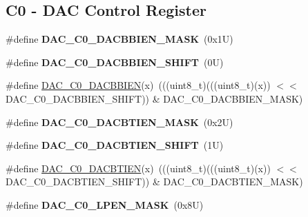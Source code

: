 \subsection*{C0 -\/ D\+AC Control Register}
\begin{DoxyCompactItemize}
\item 
\mbox{\label{group___d_a_c___register___masks_gadc37ad99d42f4b9d0e26ce03f2ac79ad}} 
\#define {\bfseries D\+A\+C\+\_\+\+C0\+\_\+\+D\+A\+C\+B\+B\+I\+E\+N\+\_\+\+M\+A\+SK}~(0x1\+U)
\item 
\mbox{\label{group___d_a_c___register___masks_ga956aa991114a1bb71a891e66d7092d1e}} 
\#define {\bfseries D\+A\+C\+\_\+\+C0\+\_\+\+D\+A\+C\+B\+B\+I\+E\+N\+\_\+\+S\+H\+I\+FT}~(0\+U)
\item 
\#define \mbox{\hyperlink{group___d_a_c___register___masks_ga897a82572de7b549bb53f9544086ea6b}{D\+A\+C\+\_\+\+C0\+\_\+\+D\+A\+C\+B\+B\+I\+EN}}(x)~(((uint8\+\_\+t)(((uint8\+\_\+t)(x)) $<$$<$ D\+A\+C\+\_\+\+C0\+\_\+\+D\+A\+C\+B\+B\+I\+E\+N\+\_\+\+S\+H\+I\+FT)) \& D\+A\+C\+\_\+\+C0\+\_\+\+D\+A\+C\+B\+B\+I\+E\+N\+\_\+\+M\+A\+SK)
\item 
\mbox{\label{group___d_a_c___register___masks_gad8a60a2fa6211ff08bba4b9648fb8daa}} 
\#define {\bfseries D\+A\+C\+\_\+\+C0\+\_\+\+D\+A\+C\+B\+T\+I\+E\+N\+\_\+\+M\+A\+SK}~(0x2\+U)
\item 
\mbox{\label{group___d_a_c___register___masks_ga1f8eb9a96341365badba1280bed49e05}} 
\#define {\bfseries D\+A\+C\+\_\+\+C0\+\_\+\+D\+A\+C\+B\+T\+I\+E\+N\+\_\+\+S\+H\+I\+FT}~(1\+U)
\item 
\#define \mbox{\hyperlink{group___d_a_c___register___masks_gabc7d24355da2dbae3e80fe7bb3119e72}{D\+A\+C\+\_\+\+C0\+\_\+\+D\+A\+C\+B\+T\+I\+EN}}(x)~(((uint8\+\_\+t)(((uint8\+\_\+t)(x)) $<$$<$ D\+A\+C\+\_\+\+C0\+\_\+\+D\+A\+C\+B\+T\+I\+E\+N\+\_\+\+S\+H\+I\+FT)) \& D\+A\+C\+\_\+\+C0\+\_\+\+D\+A\+C\+B\+T\+I\+E\+N\+\_\+\+M\+A\+SK)
\item 
\mbox{\label{group___d_a_c___register___masks_ga54a04b9ae84c5a4f8977ae2e1a889717}} 
\#define {\bfseries D\+A\+C\+\_\+\+C0\+\_\+\+L\+P\+E\+N\+\_\+\+M\+A\+SK}~(0x8\+U)
\item 
\mbox{\label{group___d_a_c___register___masks_ga97aaa812a3938df3559cb40b893db431}} 

\end{DoxyCompactItemize}
